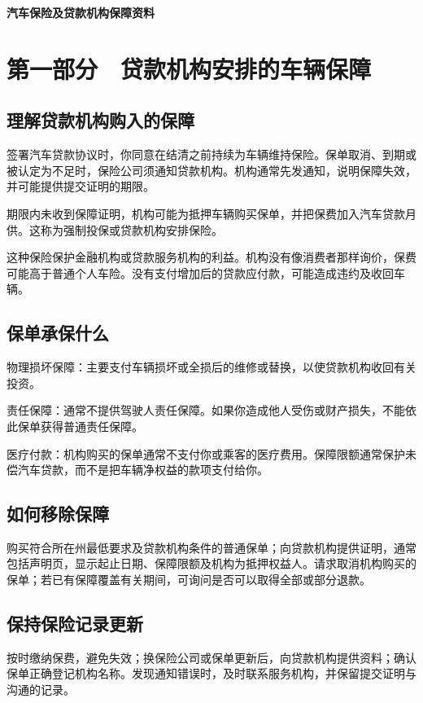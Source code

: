 \documentclass[UTF8,fontset=none,11pt,a4paper]{ctexart}
\begin{document}
{\noindent\LARGE\bfseries 汽车保险及贷款机构保障资料\par}
\vspace{10pt}
\section*{第一部分　贷款机构安排的车辆保障}
\subsection*{理解贷款机构购入的保障}
签署汽车贷款协议时，你同意在结清之前持续为车辆维持保险。保单取消、到期或被认定为不足时，保险公司须通知贷款机构。机构通常先发通知，说明保障失效，并可能提供提交证明的期限。


期限内未收到保障证明，机构可能为抵押车辆购买保单，并把保费加入汽车贷款月供。这称为强制投保或贷款机构安排保险。


这种保险保护金融机构或贷款服务机构的利益。机构没有像消费者那样询价，保费可能高于普通个人车险。没有支付增加后的贷款应付款，可能造成违约及收回车辆。


\subsection*{保单承保什么}
物理损坏保障：主要支付车辆损坏或全损后的维修或替换，以使贷款机构收回有关投资。


责任保障：通常不提供驾驶人责任保障。如果你造成他人受伤或财产损失，不能依此保单获得普通责任保障。


医疗付款：机构购买的保单通常不支付你或乘客的医疗费用。保障限额通常保护未偿汽车贷款，而不是把车辆净权益的款项支付给你。


\subsection*{如何移除保障}
购买符合所在州最低要求及贷款机构条件的普通保单；向贷款机构提供证明，通常包括声明页，显示起止日期、保障限额及机构为抵押权益人。请求取消机构购买的保单；若已有保障覆盖有关期间，可询问是否可以取得全部或部分退款。


\subsection*{保持保险记录更新}
按时缴纳保费，避免失效；换保险公司或保单更新后，向贷款机构提供资料；确认保单正确登记机构名称。发现通知错误时，及时联系服务机构，并保留提交证明与沟通的记录。
\end{document}
